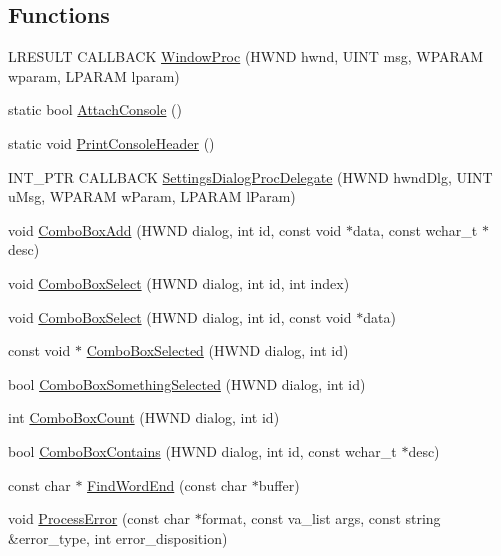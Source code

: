 \subsection*{Functions}
\begin{DoxyCompactItemize}
\item 
L\+R\+E\+S\+U\+LT C\+A\+L\+L\+B\+A\+CK \hyperlink{namespacemage_a327147b1d76dcb41c17c23f9603d80c1}{Window\+Proc} (H\+W\+ND hwnd, U\+I\+NT msg, W\+P\+A\+R\+AM wparam, L\+P\+A\+R\+AM lparam)
\item 
static bool \hyperlink{namespacemage_a720768843a1d752ebf061e1475fa004f}{Attach\+Console} ()
\item 
static void \hyperlink{namespacemage_afb64e5bf4755b0a56a7b0d086bc5f4be}{Print\+Console\+Header} ()
\item 
I\+N\+T\+\_\+\+P\+TR C\+A\+L\+L\+B\+A\+CK \hyperlink{namespacemage_a6b352e8d2bf3eeccf1a5dec3f1cf4130}{Settings\+Dialog\+Proc\+Delegate} (H\+W\+ND hwnd\+Dlg, U\+I\+NT u\+Msg, W\+P\+A\+R\+AM w\+Param, L\+P\+A\+R\+AM l\+Param)
\item 
void \hyperlink{namespacemage_a78e4a1d3c21d6eb8657bfa0a9631d6ee}{Combo\+Box\+Add} (H\+W\+ND dialog, int id, const void $\ast$data, const wchar\+\_\+t $\ast$desc)
\item 
void \hyperlink{namespacemage_aa510d1e5e45102338fce66ae46b2b267}{Combo\+Box\+Select} (H\+W\+ND dialog, int id, int index)
\item 
void \hyperlink{namespacemage_a026dd5ecb1cea93f38193f403e878d23}{Combo\+Box\+Select} (H\+W\+ND dialog, int id, const void $\ast$data)
\item 
const void $\ast$ \hyperlink{namespacemage_affa0d91f266dfbe4ed4a29c26b04dcb8}{Combo\+Box\+Selected} (H\+W\+ND dialog, int id)
\item 
bool \hyperlink{namespacemage_afa2451527062c4213d21bdf01b1922c6}{Combo\+Box\+Something\+Selected} (H\+W\+ND dialog, int id)
\item 
int \hyperlink{namespacemage_a5c586938d7f59a82c8528fab41f17960}{Combo\+Box\+Count} (H\+W\+ND dialog, int id)
\item 
bool \hyperlink{namespacemage_a98228034fca63017765bcdf5966be239}{Combo\+Box\+Contains} (H\+W\+ND dialog, int id, const wchar\+\_\+t $\ast$desc)
\item 
const char $\ast$ \hyperlink{namespacemage_ab2e62d950dc620167f4128cb16033998}{Find\+Word\+End} (const char $\ast$buffer)
\item 
void \hyperlink{namespacemage_a958c4a88b6cd58f950e1c9b9e46f6906}{Process\+Error} (const char $\ast$format, const va\+\_\+list args, const string \&error\+\_\+type, int error\+\_\+disposition)

\end{DoxyCompactItemize}
